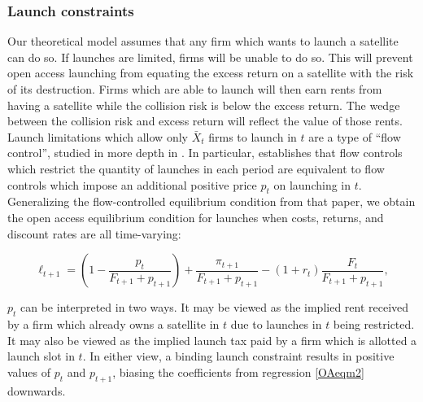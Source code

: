 \documentclass[12pt]{article}
\begin{document}
\subsubsection*{Launch constraints}

Our theoretical model assumes that any firm which wants to launch a satellite can do so. If launches are limited, firms will be unable to do so. This will prevent open access launching from equating the excess return on a satellite with the risk of its destruction. Firms which are able to launch will then earn rents from having a satellite while the collision risk is below the excess return. The wedge between the collision risk and excess return will reflect the value of those rents. \\

Launch limitations which allow only $\bar{X}_t$ firms to launch in $t$ are a type of ``flow control'', studied in more depth in \citet{raoJMP}. In particular, \citet{raoJMP} establishes that flow controls which restrict the quantity of launches in each period are equivalent to flow controls which impose an additional positive price $p_t$ on launching in $t$. Generalizing the flow-controlled equilibrium condition from that paper, we obtain the open access equilibrium condition for launches when costs, returns, and discount rates are all time-varying:

\begin{equation}
\label{OAfloweqmcond}
\ell_{t+1} = (1 - \frac{p_t}{F_{t+1} + p_{t+1}}) + \frac{\pi_{t+1}}{F_{t+1} + p_{t+1}} - (1+r_t)\frac{F_t}{F_{t+1} + p_{t+1}},
\end{equation}

$p_t$ can be interpreted in two ways. It may be viewed as the implied rent received by a firm which already owns a satellite in $t$ due to launches in $t$ being restricted. It may also be viewed as the implied launch tax paid by a firm which is allotted a launch slot in $t$. In either view, a binding launch constraint results in positive values of $p_t$ and $p_{t+1}$, biasing the coefficients from regression \ref{OAeqm2} downwards. %
\end{document}
